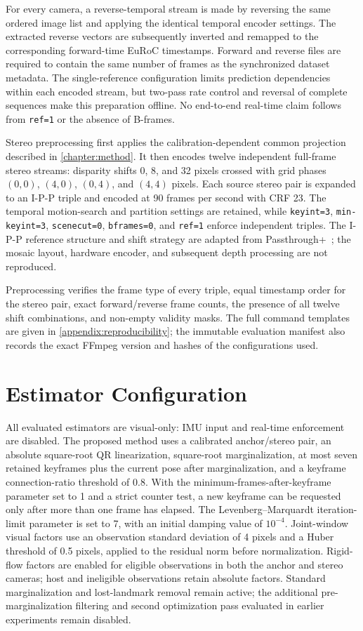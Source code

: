 For every camera, a reverse-temporal stream is made by reversing the same ordered
image list and applying the identical temporal encoder settings. The extracted
reverse vectors are subsequently inverted and remapped to the corresponding
forward-time EuRoC timestamps. Forward and reverse files are required to contain
the same number of frames as the synchronized dataset metadata.
The single-reference configuration limits prediction dependencies within each
encoded stream, but two-pass rate control and reversal of complete sequences
make this preparation offline. No end-to-end real-time claim follows from
\texttt{ref=1} or the absence of B-frames.

Stereo preprocessing first applies the calibration-dependent common projection
described in \autoref{chapter:method}. It then encodes twelve independent
full-frame stereo streams: disparity shifts 0, 8, and 32 pixels crossed with
grid phases $(0,0)$, $(4,0)$, $(0,4)$, and $(4,4)$ pixels. Each source stereo
pair is expanded to an I-P-P triple and encoded at 90 frames per second with
CRF 23. The temporal motion-search and partition settings are retained, while
\texttt{keyint=3}, \texttt{min-keyint=3}, \texttt{scenecut=0},
\texttt{bframes=0}, and \texttt{ref=1} enforce independent triples. The I-P-P
reference structure and shift strategy are adapted from Passthrough+~\cite{chaurasia2020passthrough}; the mosaic layout,
hardware encoder, and subsequent depth processing are not reproduced.

Preprocessing verifies the frame type of every triple, equal timestamp order for
the stereo pair, exact forward/reverse frame counts, the presence of all twelve
shift combinations, and non-empty validity masks. The full command templates are
given in \autoref{appendix:reproducibility}; the immutable evaluation manifest
also records the exact FFmpeg version and hashes of the configurations used.

\section{Estimator Configuration}

All evaluated estimators are visual-only: IMU input and real-time enforcement are
disabled. The proposed method uses a calibrated anchor/stereo pair, an absolute square-root QR
linearization, square-root marginalization, at most seven retained keyframes
plus the current pose after marginalization, and a keyframe connection-ratio threshold of 0.8. With the
minimum-frames-after-keyframe parameter set to 1 and a strict counter test, a
new keyframe can be requested only after more than one frame has elapsed.
The Levenberg--Marquardt iteration-limit parameter is set to 7, with an
initial damping value of $10^{-4}$. Joint-window visual factors use an observation
standard deviation of 4 pixels and a Huber threshold of 0.5 pixels, applied to
the residual norm before normalization. Rigid-flow factors are enabled for
eligible observations in both the anchor and stereo cameras; host and
ineligible observations retain absolute factors. Standard marginalization and
lost-landmark removal
remain active; the additional pre-marginalization filtering and second
optimization pass evaluated in earlier experiments remain disabled.

